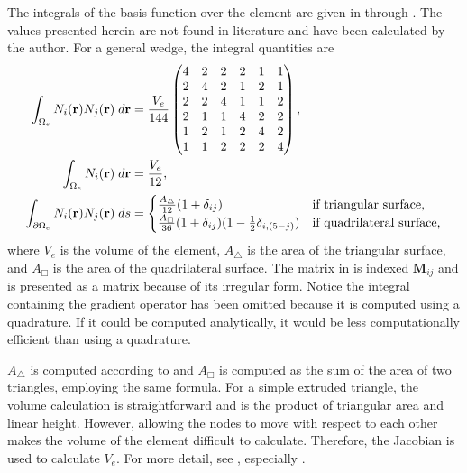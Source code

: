       The integrals of the basis function over the element are given in
       through . The values
      presented herein are not found in literature and have been calculated by
      the author. For a general wedge, the integral quantities are
      \begin{align}
        \label{eq:bigmat}
        \int_{\Omega_e} N_i(\mathbf{r}) N_j(\mathbf{r}) \;d\mathbf{r} &= 
          \frac{V_e}{144}
          \begin{pmatrix}
            4 & 2 & 2 & 2 & 1 & 1 \\
            2 & 4 & 2 & 1 & 2 & 1 \\
            2 & 2 & 4 & 1 & 1 & 2 \\
            2 & 1 & 1 & 4 & 2 & 2 \\
            1 & 2 & 1 & 2 & 4 & 2 \\
            1 & 1 & 2 & 2 & 2 & 4 
          \end{pmatrix}, \\
        \int_{\Omega_e} N_i(\mathbf{r}) \;d\mathbf{r} &= \frac{V_e}{12}, \\
        \label{eq:wedge_surface_integral}
        \int_{\partial \Omega_e} N_i(\mathbf{r}) 
          N_j(\mathbf{r}) \;ds &= 
          \begin{cases}
            \frac{A_{\triangle}}{12}(1+\delta_{ij}) & 
              \text{if triangular surface,} \\
            \frac{A_{\Box}}{36}(1+\delta_{ij})(1-\frac{1}{2} \delta_{i,(5-j)}) &
              \text{if quadrilateral surface,}
          \end{cases}
      \end{align}
      where $V_e$ is the volume of the element, $A_{\triangle}$ is the area of 
      the triangular surface, and $A_{\Box}$ is the area of the quadrilateral
      surface.  The matrix in  is indexed $\mathbf{M}_{ij}$ and
      is presented as a matrix because of its irregular form. Notice the
      integral containing the gradient operator has been omitted because it is
      computed using a quadrature. If it could be computed analytically, it
      would be less computationally efficient than using a quadrature.
      
      $A_{\triangle}$ is computed according to  and
      $A_{\Box}$ is computed as the sum of the area of two triangles, employing
      the same formula. For a simple extruded triangle, the volume calculation 
      is straightforward and is the product of triangular area and linear 
      height. However, allowing the nodes to move with respect to each other 
      makes the volume of the element difficult to calculate. Therefore, the 
      Jacobian is used to calculate $V_e$. For more detail, see 
      , especially .

